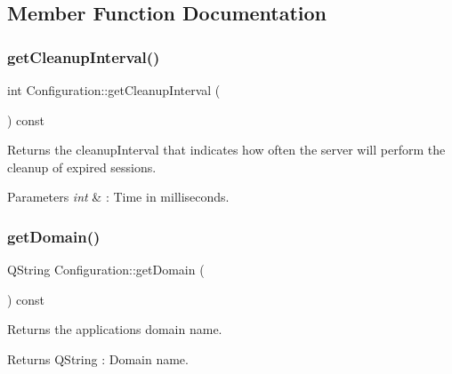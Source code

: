 \subsection{Member Function Documentation}
\mbox{\label{class_configuration_a6a592b2194d4059f31aaf4223ee2e70e}} 
\subsubsection{\texorpdfstring{get\+Cleanup\+Interval()}{getCleanupInterval()}}
{\footnotesize\ttfamily int Configuration\+::get\+Cleanup\+Interval (\begin{DoxyParamCaption}{ }\end{DoxyParamCaption}) const}



Returns the cleanup\+Interval that indicates how often the server will perform the cleanup of expired sessions. 


\begin{DoxyParams}{Parameters}
{\em int} & \+: Time in milliseconds. \\
\hline
\end{DoxyParams}
\mbox{\label{class_configuration_ab58d8dc13a90745af4925e9b238c8cff}} 
\subsubsection{\texorpdfstring{get\+Domain()}{getDomain()}}
{\footnotesize\ttfamily Q\+String Configuration\+::get\+Domain (\begin{DoxyParamCaption}{ }\end{DoxyParamCaption}) const}



Returns the applications domain name. 

\begin{DoxyReturn}{Returns}
Q\+String \+: Domain name. 
\end{DoxyReturn}
\mbox{\label{class_configuration_a37ca7476a8ab5a1e6c4b5a3e07670d9f}} 
